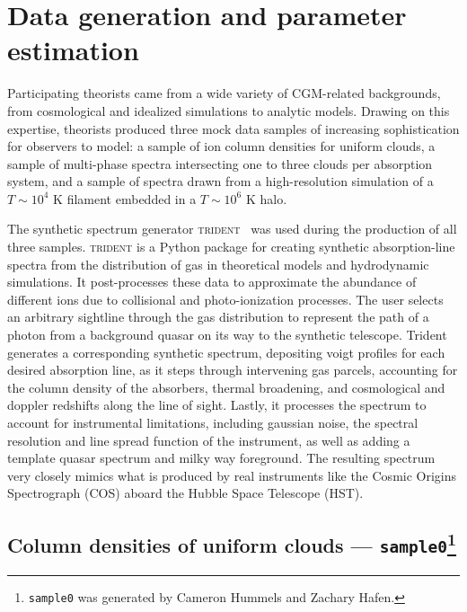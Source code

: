 \documentclass[fleqn,usenatbib]{mnras}
\begin{document}
\section{Data generation and parameter estimation}
\label{s: data generation}

Participating theorists came from a wide variety of CGM-related backgrounds, from cosmological and idealized simulations to analytic models.
Drawing on this expertise, theorists produced three mock data samples of increasing sophistication for observers to model:
a sample of ion column densities for uniform clouds,
a sample of multi-phase spectra intersecting one to three clouds per absorption system,
and a sample of spectra drawn from a high-resolution simulation of a $T \sim 10^4$ K filament embedded in a $T \sim 10^6$ K halo.

The synthetic spectrum generator \textsc{trident}~\citep{hummels2017Trident} was used during the production of all three samples.  \textsc{trident} is a Python package for creating synthetic absorption-line spectra from the distribution of gas in theoretical models and hydrodynamic simulations. It post-processes these data to approximate the abundance of different ions due to collisional and photo-ionization processes.  The user selects an arbitrary sightline through the gas distribution to represent the path of a photon from a background quasar on its way to the synthetic telescope.  Trident generates a corresponding synthetic spectrum, depositing voigt profiles for each desired absorption line, as it steps through intervening gas parcels, accounting for the column density of the absorbers, thermal broadening, and cosmological and doppler redshifts along the line of sight.  Lastly, it processes the  spectrum to account for instrumental limitations, including gaussian noise, the spectral resolution and line spread function of the instrument, as well as adding a template quasar spectrum and milky way foreground.  The resulting spectrum very closely mimics what is produced by real instruments like the Cosmic Origins Spectrograph (COS) aboard the Hubble Space Telescope (HST).

\subsection[Column densities of uniform clouds --- \texttt{sample0}]{Column densities of uniform clouds --- \texttt{sample0}\footnote{
\texttt{sample0} was generated by Cameron Hummels and Zachary Hafen.}}
\label{s: data generation -- sample0}
\end{document}
